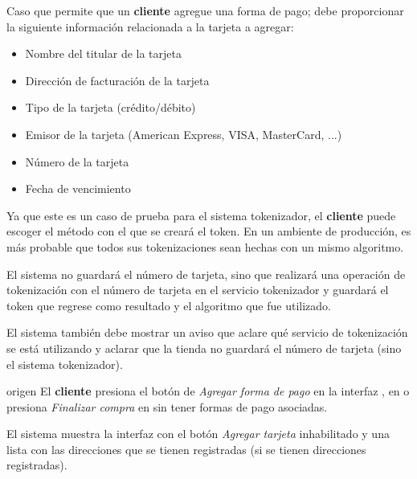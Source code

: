 %
%

{
  Caso que permite que un \textbf{cliente} agregue una forma de pago; debe
  proporcionar la siguiente información relacionada a la tarjeta a agregar:
  \begin{itemize}
    \item Nombre del titular de la tarjeta
    \item Dirección de facturación de la tarjeta
    \item Tipo de la tarjeta (crédito/débito)
    \item Emisor de la tarjeta (American Express, VISA, MasterCard, ...)
    \item Número de la tarjeta
    \item Fecha de vencimiento
  \end{itemize}

  \begin{hangparas}{2em}{0}
    Ya que este es un caso de prueba para el sistema tokenizador, el
    \textbf{cliente} puede escoger el método con el que se creará el token.
    En un ambiente de producción, es más probable que todos sus tokenizaciones
    sean hechas con un mismo algoritmo.

    El sistema no guardará el número de tarjeta, sino que realizará una
    operación de tokenización con el número de tarjeta en el servicio tokenizador
    y guardará el token que regrese como resultado y el algoritmo que fue
    utilizado.

    El sistema también debe mostrar un aviso que aclare qué servicio de
    tokenización se está utilizando y aclarar que la tienda no guardará el
    número de tarjeta (sino el sistema tokenizador).
  \end{hangparas}

  \begin{trayectoriaPrincipal}

    \item[origen] El \textbf{cliente} presiona el botón de
      \textit{Agregar forma de pago} en la interfaz
      , en
       o presiona
      \textit{Finalizar compra} en 
      sin tener formas de pago asociadas.

    \item El sistema muestra la interfaz
       con el botón
      \textit{Agregar tarjeta} inhabilitado y una lista con las direcciones
      que se tienen registradas (si se tienen direcciones registradas).


\end{trayectoriaPrincipal}}

